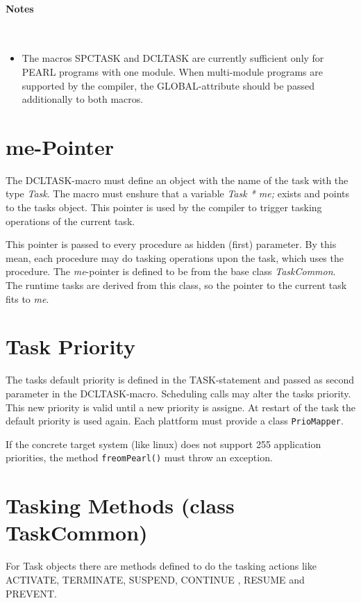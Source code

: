 \paragraph{Notes}\ \\
\begin{itemize}
\item The macros SPCTASK and DCLTASK are currently sufficient only for
    PEARL programs with one module. When multi-module programs
    are supported by the compiler, the GLOBAL-attribute should be 
    passed additionally to both macros.
\end{itemize}

\section{me-Pointer}
The DCLTASK-macro must define an object with the name of the
task with the type {\em Task}.
The macro must enshure that a variable  {\em Task * me;} exists
and points to the tasks object. This pointer is used
by the compiler to trigger tasking operations of the current
task.

This pointer is passed to every procedure as hidden (first) parameter.
By this mean, each procedure may do tasking operations upon the
task, which uses the procedure.
The {\em me}-pointer is defined to be from the base class  {\em TaskCommon}. 
The runtime tasks are derived from this class, so the pointer to the current 
task fits to {\em me}.

\section{Task Priority}
The tasks default priority is defined in the TASK-statement and passed
as second parameter in the DCLTASK-macro.
Scheduling calls may alter the tasks priority. This new priority is valid 
until a new priority is assigne. At restart of the task the default 
priority is used again. Each plattform must provide a class \verb|PrioMapper|.

If the concrete target system (like linux) does not support 255 
 application priorities, the method \verb|freomPearl()| must throw
an exception.

\section{Tasking Methods (class TaskCommon)}
For Task objects there are methods defined to do the tasking actions like
ACTIVATE, TERMINATE, SUSPEND, CONTINUE , RESUME and PREVENT.

